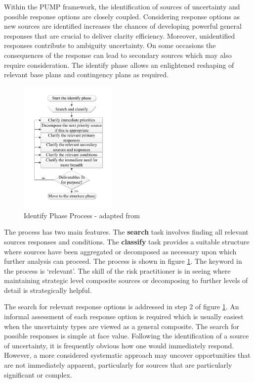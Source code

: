 Within the PUMP framework, the identification of sources of uncertainty and possible response options are closely coupled. 
Considering response options as new sources are identified increases the chances of developing powerful general responses that are crucial to deliver clarity efficiency. 
Moreover, unidentified responses contribute to ambiguity uncertainty. 
On some occasions the consequences of the response can lead to secondary sources which may also require consideration.
The identify phase allows an enlightened reshaping of relevant base plans and contingency plans as required.

\begin{figure}[!h]
  \centering
    \includegraphics[width = 0.42\textwidth]{./Figures/Identify.pdf} 
\caption{Identify Phase Process - adapted from \cite{chapman}}
\label{Figure:Identify}
\end{figure}

The process has two main features. 
The \textbf{search} task involves finding all relevant sources responses and conditions. 
The \textbf{classify} task provides a suitable structure where sources have been aggregated or decomposed as necessary upon which further analysis can proceed.
The process is shown in figure \ref{Figure:Identify}.
The keyword in the process is `relevant'. 
The skill of the risk practitioner is in seeing where maintaining strategic level composite sources or decomposing to further levels of detail is strategically helpful.

The search for relevant response options is addressed in step 2 of figure \ref{Figure:Identify}.
An informal assessment of each response option is required which is usually easiest when the uncertainty types are viewed as a general composite.
The search for possible responses is simple at face value.
Following the identification of a source of uncertainty, it is frequently obvious how one would immediately respond.
However, a more considered systematic approach may uncover opportunities that are not immediately apparent, particularly for sources that are particularly significant or complex.

